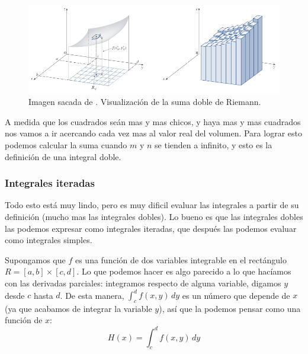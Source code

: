 \documentclass[12pt]{article}
\begin{document}
\begin{figure}[H]
  \centering
  \includegraphics[width=\linewidth]{imagenes/vol-integrado-2.png}
  \caption{Imagen sacada de \parencite{stewart2}. Visualización de la suma doble de Riemann.}
  \label{fig:integrales-2}
\end{figure}

A medida que los cuadrados seán mas y mas chicos, y haya mas y mas cuadrados nos vamos a ir acercando cada vez mas al valor real del volumen. Para lograr esto podemos calcular la suma cuando $ m $ y $ n $ se tienden a infinito, y esto es la definición de una integral doble.

\vspace{0.2cm}
\vspace{0.2cm}

\subsubsection{Integrales iteradas}
Todo esto está muy lindo, pero es muy dificil evaluar las integrales a partir de su definición (mucho mas las integrales dobles). Lo bueno es que las integrales dobles las podemos expresar como integrales iteradas, que después las podemos evaluar como integrales simples.

Supongamos que $ f $ es una función de dos variables integrable en el rectángulo $ R=\left[a,b\right]\times \left[c,d\right] $. Lo que podemos hacer es algo parecido a lo que hacíamos con las derivadas parciales: integramos respecto de alguna variable, digamos $ y $ desde $ c $ hasta $ d $. De esta manera, $ \int_{c}^{d} f(x,y) \,dy $ es un número que depende de $ x $ (ya que acabamos de integrar la variable $ y $), así que la podemos pensar como una función de $ x $:
\[
  H(x)=\int_{c}^{d} f(x,y) \,dy
\]
\end{document}

